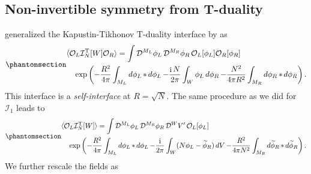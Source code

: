 \documentclass[
  letterpaper,
  DIV=11,
  numbers=noendperiod]{scrreport}
\DeclareMathOperator{\imunit}{i}
\begin{document}
\subsection{Non-invertible symmetry from
T-duality}\label{non-invertible-symmetry-from-t-duality}

\textcite{Choi:2021kmx} generalized the Kapustin-Tikhonov T-duality
interface by \textcite{Kapustin:2009av} as
\begin{equation}\phantomsection\label{eq-TN-interface}{
\begin{multlined}
\langle \mathcal{O}_L \mathcal{I}^\text{T}_N[W] \mathcal{O}_R  \rangle= 
\int \mathop{\mathcal{D}^{M_L}\phi_L}\mathop{\mathcal{D}^{M_R}\phi_R}
\mathcal{O}_L[\phi_L]\mathcal{O}_R[\phi_R]\\
\exp\left(-\frac{R^2}{4\pi}\int_{M_L}\mathop{d\phi_L}*\mathop{d\phi_L}
-\frac{\imunit N}{2\pi}\int_W \phi_L\mathop{d\phi_R}
-\frac{N^2}{4\pi R^2}\int_{M_R}\mathop{d\phi_R}*\mathop{d\phi_R}\right).
\end{multlined}
}\end{equation} This interface is a \emph{self-interface} at
\(R=\sqrt{N}\). The same procedure as we did for \(\mathcal{I}_1\) leads
to \begin{equation}\phantomsection\label{eq-TN-interface2}{
\begin{multlined}
\langle\mathcal{O}_L \mathcal{I}^\text{T}_N[W] \rangle= 
\int \mathop{\mathcal{D}^{M_L}\phi_L}\mathop{\mathcal{D}^{M_R}\phi_R}\mathop{\mathcal{D}^{W}V'}
\mathcal{O}_L[\phi_L]\\
\exp\left(-\frac{R^2}{4\pi}\int_{M_L}\mathop{d\phi_L}*\mathop{d\phi_L}
-\frac{\imunit }{2\pi}\int_W (N \phi_L - \widetilde{\phi}_R)\mathop{dV}
-\frac{R^2}{4\pi N^2}\int_{M_R}\mathop{d\widetilde\phi_R}*\mathop{d\widetilde\phi_R}\right).
\end{multlined}
}\end{equation} We further rescale the fields as
\end{document}

